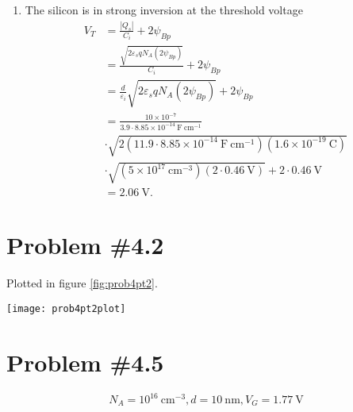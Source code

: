 \documentclass{article}
\begin{document}
\begin{enumerate}
{\begin{align*}
          &= 0.46 ~\mathrm{V} + (10 \times 10^{-7} ~\mathrm{cm})
                    (0.0259 ~\mathrm{V})
                    \frac{11.9}{3.9} 
                    \left|\frac{\sqrt{2} \cdot 4.21}
                               {5.84 \times 10^{-7} ~\mathrm{cm}}\right| \\
          &= 1.27 ~\mathrm{V}.
        \end{align*}
       }
  \item{The silicon is in strong inversion at the threshold voltage
        \begin{align*}
          V_T &= \frac{|Q_s|}{C_i} + 2 \psi_{Bp} \\
              &= \frac{\sqrt{2 \varepsilon_s q N_A (2 \psi_{Bp})}}{C_i} + 2\psi_{Bp} \\
              &= \frac{d}{\varepsilon_i}\sqrt{2 \varepsilon_s q N_A (2 \psi_{Bp})} + 2\psi_{Bp} \\
              &= \frac{10 \times 10^{-7}}
                      {3.9 \cdot 8.85 \times 10^{-14} ~\mathrm{F}~\mathrm{cm}^{-1}} \\
              &\cdot \sqrt{2(11.9 \cdot 8.85 \times 10^{-14} ~\mathrm{F}~\mathrm{cm}^{-1})
                        (1.6 \times 10^{-19} ~\mathrm{C})} \\
              &\cdot \sqrt{
                        (5 \times 10^{17} ~\mathrm{cm}^{-3})
                        (2 \cdot 0.46 ~\mathrm{V})}
               + 2 \cdot 0.46 ~\mathrm{V} \\
              &= 2.06 ~\mathrm{V}.
        \end{align*}
       }
\end{enumerate}

\pagebreak

\section*{Problem \#4.2}
Plotted in figure \ref{fig:prob4pt2}.

\begin{sidewaysfigure}
  \centering
  \texttt{[image: prob4pt2plot]}
  \caption{Surface charge plot for problem \#4.2. \label{fig:prob4pt2}}
\end{sidewaysfigure}

\section*{Problem \#4.5}
$$N_A = 10^{16} ~\mathrm{cm}^{-3}, d = 10 ~\mathrm{nm}, V_G = 1.77 ~\mathrm{V}$$
\end{document}

